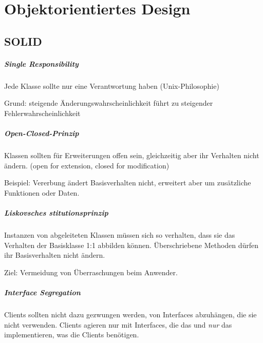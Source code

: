 \chapter{Objektorientiertes Design}\label{objektorientiertes-design}

\section{SOLID}\label{solid}

\paragraph{Single Responsibility}\label{single-responsibility}

Jede Klasse sollte nur eine Verantwortung haben (Unix-Philosophie)

Grund: steigende Änderungswahrscheinlichkeit führt zu steigender
Fehlerwahrscheinlichkeit

\paragraph{Open-Closed-Prinzip}\label{open-closed-prinzip}

Klassen sollten für Erweiterungen offen sein, gleichzeitig aber ihr
Verhalten nicht ändern. (open for extension, closed for modification)

Beispiel: Vererbung ändert Basisverhalten nicht, erweitert aber um
zusätzliche Funktionen oder Daten.

\paragraph{Liskovsches
stitutionsprinzip}\label{liskovsches-substitutionsprinzip}

Instanzen von abgeleiteten Klassen müssen sich so verhalten, dass sie
das Verhalten der Basisklasse 1:1 abbilden können. Überschriebene
Methoden dürfen ihr Basisverhalten nicht ändern.

Ziel: Vermeidung von Überraschungen beim Anwender.

\paragraph{Interface Segregation}\label{interface-segregation}

Clients sollten nicht dazu gezwungen werden, von Interfaces abzuhängen,
die sie nicht verwenden. Clients agieren nur mit Interfaces, die das und
\emph{nur} das implementieren, was die Clients benötigen.


